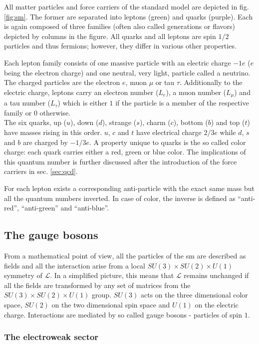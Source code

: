 All matter particles and force carriers of the standard model are depicted in fig. \ref{fig:sm}. The former are separated into leptons (green) and quarks (purple). Each is again composed of three families (often also called generations or flavors) depicted by columns in the figure. All quarks and all leptons are spin $1/2$ particles and thus fermions; however, they differ in various other properties.


Each lepton family consists of one massive particle with an electric charge $-1e$ ($e$ being the electron charge) and one neutral, very light, particle called a neutrino. The charged particles are the electron $e$, muon $\mu$ or tau $\tau$. Additionally to the electric charge, leptons carry an electron number ($L_e$), a muon number ($L_\mu$) and a tau number ($L_\tau$) which is either $1$ if the particle is a member of the respective family or $0$ otherwise.\\

The six quarks, up ($u$), down ($d$), strange ($s$), charm ($c$), bottom ($b$) and top ($t$) have masses rising in this order. $u$, $c$ and $t$ have electrical charge $2/3e$ while $d$, $s$ and $b$ are charged by $-1/3e$. A property unique to quarks is the so called color charge: each quark carries either a red, green or blue color. The implications of this quantum number is further discussed after the introduction of the force carriers in sec. \ref{sec:qcd}. 

For each lepton exists a corresponding anti-particle with the exact same mass but all the quantum numbers inverted. In case of color, the inverse is defined as ``anti-red'', ``anti-green'' and ``anti-blue''.

\subsection{The gauge bosons}
\label{sec:gauge-bosons}
From a mathematical point of view, all the particles of the \gls{sm} are described as fields and all the interaction arise from a local $SU(3)\times SU(2) \times U(1)$ symmetry of $\mathcal{L}$. In a simplified picture, this means that $\mathcal{L}$ remains unchanged if all the fields are transformed by any set of matrices from the $SU(3)\times SU(2) \times U(1)$ group. $SU(3)$ acts on the three dimensional color space, $SU(2)$ on the two dimensional spin space and $U(1)$ on the electric charge. Interactions are mediated by so called gauge bosons - particles of spin $1$.

\subsubsection{The electroweak sector}
\label{sec:qed}

